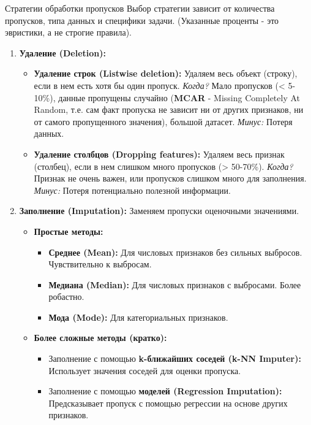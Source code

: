 \begin{textbox}{Стратегии обработки пропусков}
    Выбор стратегии зависит от количества пропусков, типа данных и специфики задачи. (Указанные проценты - это эвристики, а не строгие правила).
    \begin{enumerate}
        \item \textbf{Удаление (Deletion):}
            \begin{itemize}
                \item \textbf{Удаление строк (Listwise deletion):} Удаляем весь объект (строку), если в нем есть хотя бы один пропуск.
                    \textit{Когда?} Мало пропусков (< 5-10\%), данные пропущены случайно (\textbf{MCAR} - Missing Completely At Random, т.е. сам факт пропуска не зависит ни от других признаков, ни от самого пропущенного значения), большой датасет.
                    \textit{Минус:} Потеря данных.
                \item \textbf{Удаление столбцов (Dropping features):} Удаляем весь признак (столбец), если в нем слишком много пропусков (> 50-70\%).
                    \textit{Когда?} Признак не очень важен, или пропусков слишком много для заполнения.
                    \textit{Минус:} Потеря потенциально полезной информации.
            \end{itemize}
        \item \textbf{Заполнение (Imputation):} Заменяем пропуски оценочными значениями.
            \begin{itemize}
                \item \textbf{Простые методы:}
                    \begin{itemize}
                        \item \textbf{Среднее (Mean):} Для числовых признаков без сильных выбросов. Чувствительно к выбросам.
                        \item \textbf{Медиана (Median):} Для числовых признаков с выбросами. Более робастно.
                        \item \textbf{Мода (Mode):} Для категориальных признаков.
                    \end{itemize}
                \item \textbf{Более сложные методы (кратко):}
                    \begin{itemize}
                        \item Заполнение с помощью \textbf{k-ближайших соседей (k-NN Imputer):} Использует значения соседей для оценки пропуска.
                        \item Заполнение с помощью \textbf{моделей (Regression Imputation):} Предсказывает пропуск с помощью регрессии на основе других признаков.

\end{itemize}
\end{itemize}
\end{enumerate}
\end{textbox}
